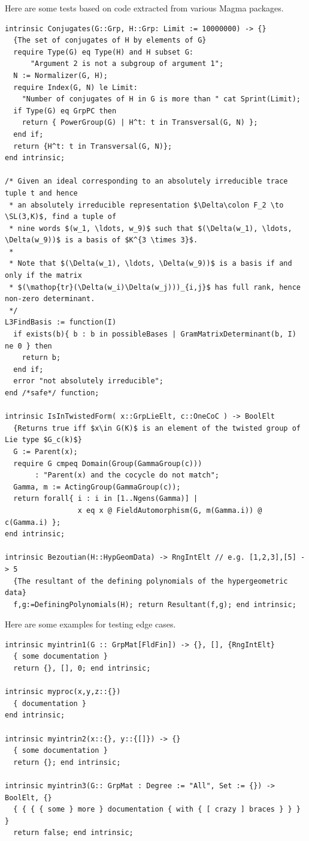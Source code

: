 \documentclass{article}
\begin{document}
Here are some tests based on code extracted from various Magma packages.

\begin{verbatim}
intrinsic Conjugates(G::Grp, H::Grp: Limit := 10000000) -> {}
  {The set of conjugates of H by elements of G}
  require Type(G) eq Type(H) and H subset G:
	  "Argument 2 is not a subgroup of argument 1";
  N := Normalizer(G, H);
  require Index(G, N) le Limit:
    "Number of conjugates of H in G is more than " cat Sprint(Limit);
  if Type(G) eq GrpPC then
    return { PowerGroup(G) | H^t: t in Transversal(G, N) };
  end if;
  return {H^t: t in Transversal(G, N)};
end intrinsic;

/* Given an ideal corresponding to an absolutely irreducible trace tuple t and hence
 * an absolutely irreducible representation $\Delta\colon F_2 \to \SL(3,K)$, find a tuple of
 * nine words $(w_1, \ldots, w_9)$ such that $(\Delta(w_1), \ldots, \Delta(w_9))$ is a basis of $K^{3 \times 3}$.
 *
 * Note that $(\Delta(w_1), \ldots, \Delta(w_9))$ is a basis if and only if the matrix
 * $(\mathop{tr}(\Delta(w_i)\Delta(w_j)))_{i,j}$ has full rank, hence non-zero determinant.
 */
L3FindBasis := function(I)
  if exists(b){ b : b in possibleBases | GramMatrixDeterminant(b, I) ne 0 } then
    return b;
  end if;
  error "not absolutely irreducible";
end /*safe*/ function;

intrinsic IsInTwistedForm( x::GrpLieElt, c::OneCoC ) -> BoolElt
  {Returns true iff $x\in G(K)$ is an element of the twisted group of Lie type $G_c(k)$}
  G := Parent(x);
  require G cmpeq Domain(Group(GammaGroup(c)))
       : "Parent(x) and the cocycle do not match";
  Gamma, m := ActingGroup(GammaGroup(c));
  return forall{ i : i in [1..Ngens(Gamma)] |
                 x eq x @ FieldAutomorphism(G, m(Gamma.i)) @ c(Gamma.i) };
end intrinsic;

intrinsic Bezoutian(H::HypGeomData) -> RngIntElt // e.g. [1,2,3],[5] -> 5
  {The resultant of the defining polynomials of the hypergeometric data}
  f,g:=DefiningPolynomials(H); return Resultant(f,g); end intrinsic;
\end{verbatim}


Here are some examples for testing edge cases.

\begin{verbatim}
intrinsic myintrin1(G :: GrpMat[FldFin]) -> {}, [], {RngIntElt}
  { some documentation }
  return {}, [], 0; end intrinsic;

intrinsic myproc(x,y,z::{})
  { documentation }
end intrinsic;

intrinsic myintrin2(x::{}, y::{[]}) -> {}
  { some documentation }
  return {}; end intrinsic;

intrinsic myintrin3(G:: GrpMat : Degree := "All", Set := {}) -> BoolElt, {}
  { { { { some } more } documentation { with { [ crazy ] braces } } } }
  return false; end intrinsic;
\end{verbatim}
\end{document}
